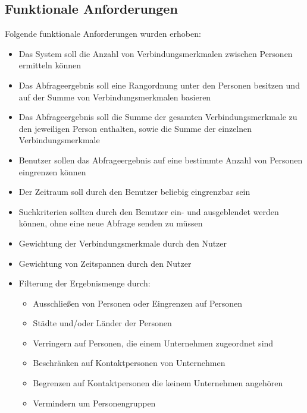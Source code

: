 \subsection{Funktionale Anforderungen}

Folgende funktionale Anforderungen wurden erhoben:

\begin{itemize}
\item Das System soll die Anzahl von Verbindungsmerkmalen zwischen Personen ermitteln können

\item Das Abfrageergebnis soll eine Rangordnung unter den Personen besitzen und auf der Summe von Verbindungsmerkmalen basieren

\item Das Abfrageergebnis soll die Summe der gesamten Verbindungsmerkmale zu den jeweiligen Person enthalten, sowie die Summe der einzelnen Verbindungsmerkmale

\item Benutzer sollen das Abfrageergebnis auf eine bestimmte Anzahl von Personen eingrenzen können

\item Der Zeitraum soll durch den Benutzer beliebig eingrenzbar sein

\item Suchkriterien sollten durch den Benutzer ein- und ausgeblendet werden können, ohne eine neue Abfrage senden zu müssen

\item Gewichtung der Verbindungsmerkmale durch den Nutzer

\item Gewichtung von Zeitspannen durch den Nutzer

\item Filterung der Ergebnismenge durch:	
	\begin{itemize}
	\item Ausschließen von Personen oder Eingrenzen auf Personen
	\item Städte und/oder Länder der Personen
	\item Verringern auf Personen, die einem Unternehmen zugeordnet sind 
	\item Beschränken auf Kontaktpersonen von Unternehmen
	\item Begrenzen auf Kontaktpersonen die keinem Unternehmen angehören
	\item Vermindern um Personengruppen
	\end{itemize}
\end{itemize}


